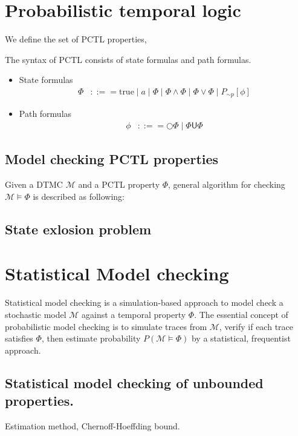 \section{Probabilistic temporal logic}
We define the set of PCTL properties,
\begin{definition}[PCTL] The syntax of PCTL consists of state formulas and path formulas.
    \begin{itemize}
        \item State formulas
              \begin{align*}
                  \Phi & ::== \text{true} \;|\; a \;|\; \Phi \;|\; \Phi \wedge \Phi \;|\; \Phi \vee \Phi \;|\;  P_{\sim  p}[\phi]
              \end{align*}
        \item Path formulas
              \begin{align*}
                  \phi & ::== \bigcirc \Phi \;|\; \Phi \mathsf{U}  \Phi
              \end{align*}
    \end{itemize}

\end{definition}

\subsection{Model checking PCTL properties}
Given a DTMC $\mathcal{M}$ and a PCTL property $\Phi$, general algorithm for checking
$\mathcal{M}\models\Phi$ is described as following:

\subsection{State exlosion problem}


\section{Statistical Model checking}
Statistical model checking is a simulation-based approach to model check a stochastic model
$\mathcal{M}$ against a temporal property $\Phi$. The essential concept of probabilistic model
checking is to simulate traces from $\mathcal{M}$, verify if each trace satisfies $\Phi$, then
estimate probability $P(\mathcal{M}\models\Phi)$ by a statistical, frequentist approach.
\subsection{Statistical model checking of unbounded properties.}
Estimation method, Chernoff-Hoeffding bound.


